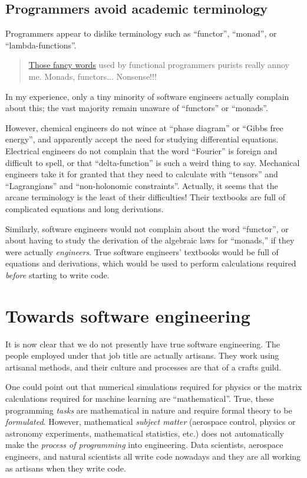 \subsection{Programmers avoid academic terminology }

Programmers appear to dislike terminology such as ``functor'', ``monad'',
or ``lambda-functions''.
\begin{quote}
{\small{}\href{https://medium.com/@javier.salcedo/those-fancy-words-used-by-functional-programmers-purists-really-annoy-me-dfef5094dc72}{Those fancy words}
used by functional programmers purists really annoy me. Monads, functors...
Nonsense!!! }{\small\par}
\end{quote}
In my experience, only a tiny minority of software engineers actually
complain about this; the vast majority remain unaware of ``functors''
or ``monads''.

However, chemical engineers do not wince at ``phase diagram'' or
``Gibbs free energy'', and apparently accept the need for studying
differential equations. Electrical engineers do not complain that
the word ``Fourier'' is foreign and difficult to spell, or that
``delta-function'' is such a weird thing to say. Mechanical engineers
take it for granted that they need to calculate with ``tensors''
and ``Lagrangians'' and ``non-holonomic constraints''. Actually,
it seems that the arcane terminology is the least of their difficulties!
Their textbooks are full of complicated equations and long derivations.

Similarly, software engineers would not complain about the word ``functor'',
or about having to study the derivation of the algebraic laws for
``monads,'' \textendash{} if they were actually \emph{engineers}.
True software engineers' textbooks would be full of equations and
derivations, which would be used to perform calculations required
\emph{before} starting to write code.

\section{Towards software engineering }

It is now clear that we do not presently have true software engineering.
The people employed under that job title are actually artisans. They
work using artisanal methods, and their culture and processes are
that of a crafts guild.

One could point out that numerical simulations required for physics
or the matrix calculations required for machine learning are ``mathematical''.
True, these programming \emph{tasks} are mathematical in nature and
require formal theory to be \emph{formulated}. However, mathematical
\emph{subject matter} (aerospace control, physics or astronomy experiments,
mathematical statistics, etc.) does not automatically make the \emph{process
of programming} into engineering. Data scientists, aerospace engineers,
and natural scientists all write code nowadays \textendash{} and they
are all working as artisans when they write code.

